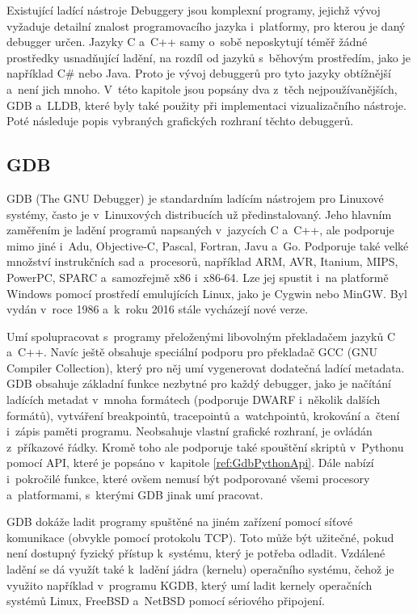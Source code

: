 \documentclass[czech,bachelor,male,python,dept460,hidelinks]{diploma}						%
\newcommand{\parspace}[1][]{
	\ifthenelse{\isempty{#1}}{\vspace{0mm}}{\vspace{#1}}
	\par
}
\begin{document}
\begin{section}{Existující ladící nástroje}
\label{sec:ExistingDebuggers}
	Debuggery jsou komplexní programy, jejichž vývoj vyžaduje detailní znalost programovacího jazyka i~platformy, pro kterou je daný debugger určen.
	Jazyky C a~C++ samy o~sobě neposkytují téměř žádné prostředky usnadňující ladění, na rozdíl od jazyků s~běhovým prostředím, jako je například C\# nebo Java.
	Proto je vývoj debuggerů pro tyto jazyky obtížnější a~není jich mnoho. V~této kapitole jsou popsány dva z~těch nejpoužívanějších,
	GDB a~LLDB, které byly také použity při implementaci vizualizačního nástroje. Poté následuje popis vybraných grafických rozhraní těchto debuggerů.

	\subsection{GDB}
		GDB (The GNU Debugger) je standardním ladícím nástrojem pro Linuxové systémy, často je v~Linuxových distribucích už předinstalovaný.
		Jeho hlavním zaměřením je ladění programů napsaných v~jazycích C a~C++, ale podporuje mimo jiné i~Adu, Objective-C, Pascal, Fortran, Javu
		a~Go. \cite{gdb-languages} Podporuje také velké množství instrukčních sad a~procesorů, například ARM, AVR, Itanium, MIPS, PowerPC, SPARC
		a~samozřejmě x86 i~x86-64. Lze jej spustit i~na platformě Windows pomocí prostředí emulujících Linux, jako je Cygwin nebo MinGW.
		Byl vydán v~roce 1986 a~k~roku 2016 stále vycházejí nové verze.
		
		\parspace Umí spolupracovat s~programy přeloženými libovolným překladačem jazyků C a~C++. Navíc ještě obsahuje
		speciální podporu pro překladač GCC (GNU Compiler Collection), který pro něj umí vygenerovat dodatečná ladící metadata.
		GDB obsahuje základní funkce nezbytné pro každý debugger, jako je načítání ladících metadat v~mnoha formátech (podporuje DWARF i~několik dalších
		formátů), vytváření breakpointů, tracepointů a~watchpointů, krokování a~čtení i~zápis paměti programu.
		Neobsahuje vlastní grafické rozhraní, je ovládán z~příkazové řádky. Kromě toho ale podporuje také spouštění skriptů v~Pythonu pomocí API,
		které je popsáno v~kapitole \ref{ref:GdbPythonApi}.
		Dále nabízí i~pokročilé funkce, které ovšem nemusí být podporované všemi procesory a~platformami, s~kterými GDB jinak umí pracovat.
		
		\parspace GDB dokáže ladit programy spuštěné na jiném zařízení pomocí síťové komunikace (obvykle pomocí protokolu TCP).
		Toto může být užitečné, pokud není dostupný fyzický přístup k~systému, který je potřeba odladit.
		Vzdálené ladění se dá využít také k~ladění jádra (kernelu) operačního systému, čehož je využito například v~programu KGDB, který umí ladit
		kernely operačních systémů Linux, FreeBSD a~NetBSD pomocí sériového připojení.
		

\end{section}
\end{document}

